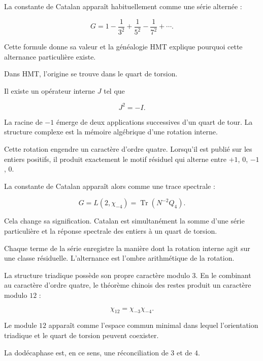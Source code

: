 La constante de Catalan apparaît habituellement comme une série alternée :\par

\[
G
=
1-\frac1{3^2}+\frac1{5^2}-\frac1{7^2}+\cdots.
\]

Cette formule donne sa valeur et la généalogie HMT explique pourquoi cette alternance particulière existe.\par

Dans HMT, l’origine se trouve dans le quart de torsion.\par

Il existe un opérateur interne \(J\) tel que\par

\[
J^2=-I.
\]

La racine de \(-1\) émerge de deux applications successives d’un quart de tour. La structure complexe est la mémoire algébrique d’une rotation interne.\par

Cette rotation engendre un caractère d’ordre quatre. Lorsqu’il est publié sur les entiers positifs, il produit exactement le motif résiduel qui alterne entre \(+1\), \(0\), \(-1\), \(0\).\par

La constante de Catalan apparaît alors comme une trace spectrale :\par

\[
G
=
L(2,\chi_{-4})
=
\operatorname{Tr}(N^{-2}Q_4).
\]

Cela change sa signification. Catalan est simultanément la somme d’une série particulière et la réponse spectrale des entiers à un quart de torsion.\par

Chaque terme de la série enregistre la manière dont la rotation interne agit sur une classe résiduelle. L’alternance est l’ombre arithmétique de la rotation.\par

La structure triadique possède son propre caractère modulo \(3\). En le combinant au caractère d’ordre quatre, le théorème chinois des restes produit un caractère modulo \(12\) :\par

\[
\chi_{12}
=
\chi_{-3}\chi_{-4}.
\]

Le module \(12\) apparaît comme l’espace commun minimal dans lequel l’orientation triadique et le quart de torsion peuvent coexister.\par

La dodécaphase est, en ce sens, une réconciliation de \(3\) et de \(4\).\par

